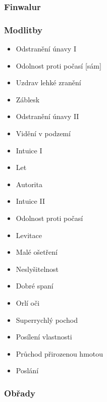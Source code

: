 \documentclass[../main.tex]{subfiles}
\begin{document}
\subsubsection{Finwalur}
\label{sec:finwalur}

\subsubsection*{Modlitby}
\label{sec:finwalur_modlitby}

\begin{multicols}{2}
	\begin{itemize}
		\item Odstranění únavy I
		\item Odolnost proti počasí [sám]
		\item Uzdrav lehké zranění
		\item Záblesk
		\item Odstranění únavy II
		\item Vidění v podzemí
		\item Intuice I
		\item Let 
		\item Autorita
		\item Intuice II
		\item Odolnost proti počasí
		\item Levitace
		\item Malé ošetření
		\item Neslyšitelnost
		\item Dobré spaní
		\item Orlí oči
		\item Superrychlý pochod
		\item Posílení vlastnosti
		\item Průchod přirozenou hmotou
		\item Poslání
	\end{itemize}
\end{multicols}

\subsubsection{Obřady}
\label{sec:finwalur_obrady}
\end{document}
